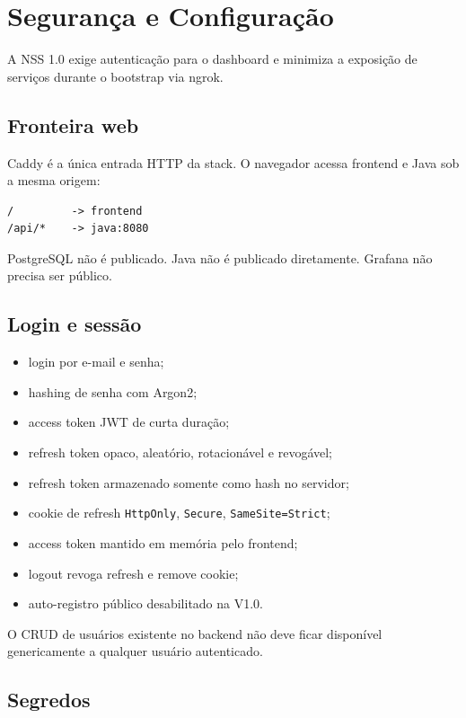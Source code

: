 \section{Segurança e Configuração}

A NSS 1.0 exige autenticação para o dashboard e minimiza a exposição de serviços durante o bootstrap via ngrok.

\subsection{Fronteira web}

Caddy é a única entrada HTTP da stack. O navegador acessa frontend e Java sob a mesma origem:

\begin{lstlisting}
/         -> frontend
/api/*    -> java:8080
\end{lstlisting}

PostgreSQL não é publicado. Java não é publicado diretamente. Grafana não precisa ser público.

\subsection{Login e sessão}

\begin{itemize}
    \item login por e-mail e senha;
    \item hashing de senha com Argon2;
    \item access token JWT de curta duração;
    \item refresh token opaco, aleatório, rotacionável e revogável;
    \item refresh token armazenado somente como hash no servidor;
    \item cookie de refresh \texttt{HttpOnly}, \texttt{Secure}, \texttt{SameSite=Strict};
    \item access token mantido em memória pelo frontend;
    \item logout revoga refresh e remove cookie;
    \item auto-registro público desabilitado na V1.0.
\end{itemize}

O CRUD de usuários existente no backend não deve ficar disponível genericamente a qualquer usuário autenticado.

\subsection{Segredos}

